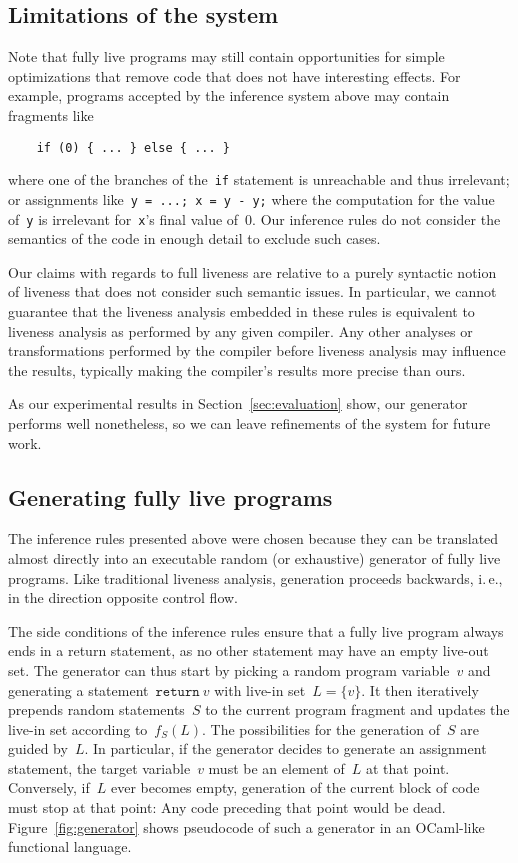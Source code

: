 \documentclass{llncs}
\begin{document}
\subsection{Limitations of the system}

Note that fully live programs may still contain opportunities for simple
optimizations that remove code that does not have interesting effects. For
example, programs accepted by the inference system above may contain
fragments like
\begin{verbatim}
    if (0) { ... } else { ... }
\end{verbatim}
where one of the branches of the~\verb|if| statement is unreachable and thus
irrelevant; or assignments like~\verb|y = ...; x = y - y;| where the
computation for the value of~\verb|y| is irrelevant for~\verb|x|'s final
value of~0. Our inference rules do not consider the semantics of the code in
enough detail to exclude such cases.

Our claims with regards to full liveness are relative to a purely syntactic
notion of liveness that does not consider such semantic issues. In
particular, we cannot guarantee that the liveness analysis embedded in
these rules is equivalent to liveness analysis as performed by any given
compiler. Any other analyses or transformations performed by the compiler
before liveness analysis may influence the results, typically making the
compiler's results more precise than ours.

As our experimental results in Section~\ref{sec:evaluation} show, our
generator performs well nonetheless, so we can leave refinements of the
system for future work.


\subsection{Generating fully live programs}

The inference rules presented above were chosen because they can be
translated almost directly into an executable random (or exhaustive)
generator of fully live programs. Like traditional liveness analysis,
generation proceeds backwards, i.\,e., in the direction opposite control
flow.

The side conditions of the inference rules ensure that a fully live program
always ends in a return statement, as no other statement may have an empty
live-out set. The generator can thus start by picking a random program
variable~\(v\) and generating a statement~\(\mathtt{return}\ v\) with
live-in set~\(L = \{v\}\). It then iteratively prepends random
statements~\(S\) to the current program fragment and updates the live-in set
according to~\(f_S(L)\). The possibilities for the generation of~\(S\) are
guided by~\(L\). In particular, if the generator decides to generate an
assignment statement, the target variable~\(v\) must be an element of~\(L\)
at that point. Conversely, if~\(L\) ever becomes empty, generation of the
current block of code must stop at that point: Any code preceding that point
would be dead. Figure~\ref{fig:generator} shows pseudocode of such a
generator in an OCaml-like functional language.
\end{document}
